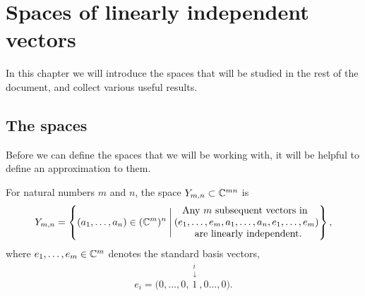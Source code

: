 



\chapter{Spaces of linearly independent vectors}


In this chapter we will introduce the spaces that will be studied in
the rest of the document, and collect various useful
results.

\section{The spaces} 
\label{sec:rum}
Before we can define the spaces that we will be working with, it will
be helpful to define an approximation to them.

\begin{definition} 
  For natural numbers $m$ and $n$, the space $Y_{m,n}\subset \mathbb{C}^{mn}$
  is 
  \[ Y_{m,n} = \left\{ (a_1,\dots,a_n) \in (\mathbb{C}^m)^n \:\Bigg\vert\:
    \begin{matrix}
      \text{Any } m \text{ subsequent vectors in } \\
      (e_1,\dots,e_m,a_1,\dots,a_n,e_1,\dots,e_m) \\
      \text{ are linearly independent.}
    \end{matrix}  \right\}, \]
  where $e_1,\dots,e_m \in \mathbb{C}^m$ denotes the standard basis
  vectors,
  \[ e_i =
  \big(0,\dots,0,\overset{\substack{i\\\downarrow}}{1},0\dots,0\big).\]
\end{definition}

